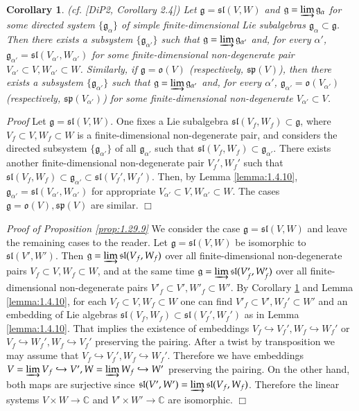 \documentclass[10pt]{amsart}
\newcounter{theorem}
\newtheorem{corollary}[theo]{Corollary}
\renewenvironment{proof}{ \emph{Proof}}{$\Box$}
\newcommand {\CC} {\mathbb {C}}
\renewcommand{\sp}{\mathfrak{sp}}
\renewcommand{\sl}{\mathfrak{sl}}
\newcommand{\oo}{\mathfrak{o}}
\renewcommand{\gg}{\mathfrak{g}}
\begin{document}
\begin{corollary}\label{standardex}(cf. [DiP2, Corollary 2.4]) Let $\gg = \sl(V,W)$ and $\gg=\varinjlim \gg_\alpha$ for some directed system
$\{\gg_{\alpha}\}$ of simple finite-dimensional Lie subalgebras
  $\gg_\alpha \subset \gg$. Then there exists a subsystem 
$\{\gg_{\alpha'}\}$ such that
$\gg=\varinjlim \gg_{\alpha'}$ and, for every $\alpha'$,
  $\gg_{\alpha'}=\sl (V_{\alpha'},W_{\alpha'})$ 
for some finite-dimensional non-degenerate pair 
$V_{\alpha'}\subset V,W_{\alpha'}\subset W$. Similarly, if  $\gg =
\oo(V)$ 
(respectively, $\sp(V)$), then 
there exists a subsystem $\{\gg_{\alpha'}\}$ such that
$\gg=\varinjlim \gg_{\alpha'}$ and, for every $\alpha'$, $\gg_{\alpha'}=\oo (V_{\alpha'})$ 
(respectively, $\sp(V_{\alpha'})$) for some finite-dimensional non-degenerate
$V_{\alpha'}\subset V$.
\end{corollary}

\begin{proof}
 Let $\gg = \sl(V,W)$. One fixes a Lie subalgebra $\sl(V_f,W_f) \subset \gg$, where $V_f \subset V, W_f \subset W$ is a finite-dimensional non-degenerate pair, and considers the directed subsystem $\{\gg_{\alpha'}\}$ of all $\gg_{\alpha'}$ such that $\sl(V_f, W_f) \subset \gg_{\alpha'}$. There exists another finite-dimensional non-degenerate pair $V_f',W_f'$ such that $\sl(V_f,W_f)\subset \gg_{\alpha'}\subset \sl(V_f',W_f')$. Then, by Lemma \ref{lemma:1.4.10}, $\gg_{\alpha'} = \sl(V_{\alpha'},W_{\alpha'})$ for appropriate $V_{\alpha'} \subset V, W_{\alpha'} \subset W$. The cases $\gg = \oo(V), \sp(V)$ are similar.
\end{proof}

\vspace{0.33cm}

\begin{proof}\textit{ of Proposition \ref{prop:1.29.9}}
We consider the case $\gg = \sl(V,W)$ and leave the remaining cases to
the reader. Let $\gg=\sl(V,W)$ be isomorphic to 
$\sl(V',W')$. Then $\gg=\varinjlim \sl(V_f,W_f)$ over all finite-dimensional 
non-degenerate pairs $V_f\subset V, W_f\subset W$, and at the same
time $\gg=\varinjlim\sl(V'_f,W'_f)$ 
over all finite-dimensional 
non-degenerate pairs $V'_f\subset V', W'_f\subset W'$. By Corollary \ref{standardex} and Lemma \ref{lemma:1.4.10}, for each $V_f\subset V,W_f\subset W$ one can 
find $V'_f\subset V',W_f'\subset W'$ and an embedding of Lie algebras
$\sl(V_f,W_f)\subset\sl(V_f',W_f')$ 
as in Lemma \ref{lemma:1.4.10}. That implies
the existence of embeddings $V_f\hookrightarrow V_f',
W_f\hookrightarrow W_f'$ or  
$V_f\hookrightarrow W_f', W_f\hookrightarrow V_f'$ preserving the pairing. After 
a twist by transposition we may 
assume that $V_f\hookrightarrow V_f', W_f\hookrightarrow
W_f'$. Therefore we have embeddings 
$V=\varinjlim V_f\hookrightarrow V', W=\varinjlim W_f\hookrightarrow W'$ preserving the pairing. 
On the other hand, both maps are surjective since
$\sl(V',W')=\varinjlim\sl(V_f,W_f)$. 
Therefore  the linear systems $V\times W\rightarrow \CC$ and 
$V' \times W' \rightarrow \CC$ are isomorphic.
\end{proof}
\end{document}
